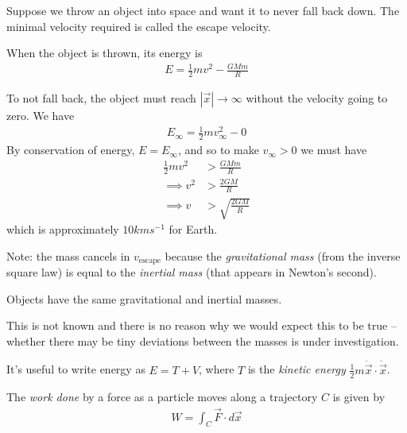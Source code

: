 \documentclass{../../template/note}
\begin{document}
    \begin{example}
        Suppose we throw an object into space and want it to never fall back down. The minimal velocity required is called the escape velocity.

        When the object is thrown, its energy is
        \begin{align*}
            E = \frac{1}{2}mv^2 - \frac{GMm}{R}
        \end{align*}

        To not fall back, the object must reach \(|\vec x| \to \infty\) without the velocity going to zero. We have
        \begin{align*}
            E_\infty = \frac{1}{2}mv_{\infty}^2 - 0
        \end{align*}
        By conservation of energy, \(E = E_\infty\), and so to make \(v_\infty > 0\) we must have
        \begin{align*}
            \frac{1}{2}mv^2 &> \frac{GMm}{R} \\
            \implies v^2 &> \frac{2GM}{R} \\
            \implies v &> \sqrt{\frac{2GM}{R}}
        \end{align*}
        which is approximately \(10\si{kms^{-1}}\) for Earth.
        
        Note: the mass cancels in \(v_\text{escape}\) because the \emph{gravitational mass} (from the inverse square law) is equal to the \emph{inertial mass} (that appears in Newton's second).
    \end{example}
    
    \begin{proposition}
        Objects have the same gravitational and inertial masses.
    \end{proposition}

    \begin{remark*}
        This is not known and there is no reason why we would expect this to be true -- whether there may be tiny deviations between the masses is under investigation.
    \end{remark*}
    
    It's useful to write energy as \(E = T + V\), where \(T\) is the \emph{kinetic energy} \(\frac{1}{2}m \dot{\vec x} \cdot \dot{\vec x}\). 

    \begin{definition}
        The \emph{work done} by a force as a particle moves along a trajectory \(C\) is given by
        \begin{align*}
            W = \int_C \vec F \cdot d \vec x
        \end{align*}
    \end{definition}
    
\end{document}
